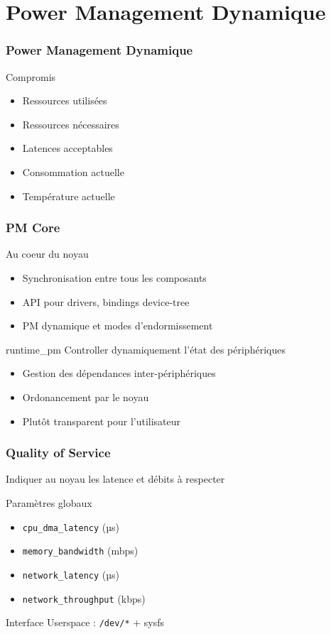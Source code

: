\section{Power Management Dynamique}

\begin{frame}
	\frametitle{Power Management Dynamique}
	\begin{block}{Compromis}
	\begin{itemize}
		\item Ressources utilisées
		\item Ressources nécessaires
		\item Latences acceptables
		\item Consommation actuelle
		\item Température actuelle
	\end{itemize}
	\end{block}
\end{frame}

\begin{frame}
	\frametitle{PM Core}
	\begin{block}{Au coeur du noyau}
		\begin{itemize}
			\item Synchronisation entre tous les composants
			\item API pour drivers, bindings device-tree
			\item PM dynamique et modes d'endormissement
		\end{itemize}
	\end{block}
	\begin{block}{runtime\_pm}
		Controller dynamiquement l'état des périphériques
		\begin{itemize}
			\item Gestion des dépendances inter-périphériques
			\item Ordonancement par le noyau
			\item Plutôt transparent pour l'utilisateur
		\end{itemize}
	\end{block}

\end{frame}

\begin{frame}
	\frametitle{Quality of Service}
	Indiquer au noyau les latence et débits à respecter
	\begin{block}{Paramètres globaux}
		\begin{itemize}
			\item \texttt{cpu\_dma\_latency} (µs)
			\item \texttt{memory\_bandwidth} (mbps)
			\item \texttt{network\_latency} (µs)
			\item \texttt{network\_throughput} (kbps)
		\end{itemize}
	\end{block}
	Interface Userspace : \texttt{/dev/*} + sysfs
\end{frame}


